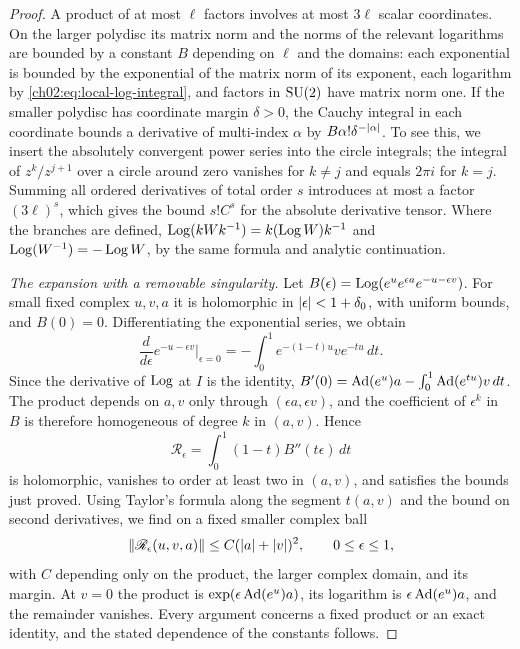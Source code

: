 \begin{proof}
A product of at most $\ell$ factors involves at most $3\ell$ scalar coordinates. On the larger polydisc its matrix norm and the norms of the relevant logarithms are bounded by a constant $B$ depending on $\ell$ and the domains: each exponential is bounded by the exponential of the matrix norm of its exponent, each logarithm by \eqref{ch02:eq:local-log-integral}, and factors in $\mathrm{SU}(2)$ have matrix norm one. If the smaller polydisc has coordinate margin $\delta>0$, the Cauchy integral in each coordinate bounds a derivative of multi-index $\alpha$ by $B\alpha!\delta^{-\lvert \alpha\rvert}$. To see this, we insert the absolutely convergent power series into the circle integrals; the integral of $z^k/z^{j+1}$ over a circle around zero vanishes for $k\ne j$ and equals $2\pi i$ for $k=j$. Summing all ordered derivatives of total order $s$ introduces at most a factor $(3\ell)^s$, which gives the bound $s!C^s$ for the absolute derivative tensor. Where the branches are defined, $\operatorname{Log}(kWk^{-1})=k(\operatorname{Log} W)k^{-1}$ and $\operatorname{Log}(W^{-1})=-\operatorname{Log} W$, by the same formula and analytic continuation.

\emph{The expansion with a removable singularity.} Let $B(\epsilon)=\operatorname{Log}(e^ue^{\epsilon a}e^{-u-\epsilon v})$. For small fixed complex $u,v,a$ it is holomorphic in $\lvert \epsilon\rvert<1+\delta_0$, with uniform bounds, and $B(0)=0$. Differentiating the exponential series, we obtain
\[
 \frac{d}{d\epsilon}e^{-u-\epsilon v}\Big|_{\epsilon=0}=-\int_0^1e^{-(1-t)u}ve^{-tu}\,dt.
\]
Since the derivative of $\operatorname{Log}$ at $I$ is the identity, $B'(0)=\operatorname{Ad}(e^u)a-\int_0^1\operatorname{Ad}(e^{tu})v\,dt$. The product depends on $a,v$ only through $(\epsilon a,\epsilon v)$, and the coefficient of $\epsilon^k$ in $B$ is therefore homogeneous of degree $k$ in $(a,v)$. Hence
\[
 \mathscr R_\epsilon=\int_0^1(1-t)B''(t\epsilon)\,dt
\]
is holomorphic, vanishes to order at least two in $(a,v)$, and satisfies the bounds just proved. Using Taylor's formula along the segment $t(a,v)$ and the bound on second derivatives, we find on a fixed smaller complex ball
\begin{equation}\label{ch02:eq:removable-remainder-order}
 \lVert \mathscr R_\epsilon(u,v,a)\rVert\le C(\lvert a\rvert+\lvert v\rvert)^2,\qquad 0\le\epsilon\le1,
\end{equation}
with $C$ depending only on the product, the larger complex domain, and its margin. At $v=0$ the product is $\exp(\epsilon\operatorname{Ad}(e^u)a)$, its logarithm is $\epsilon\operatorname{Ad}(e^u)a$, and the remainder vanishes. Every argument concerns a fixed product or an exact identity, and the stated dependence of the constants follows.
\end{proof}

